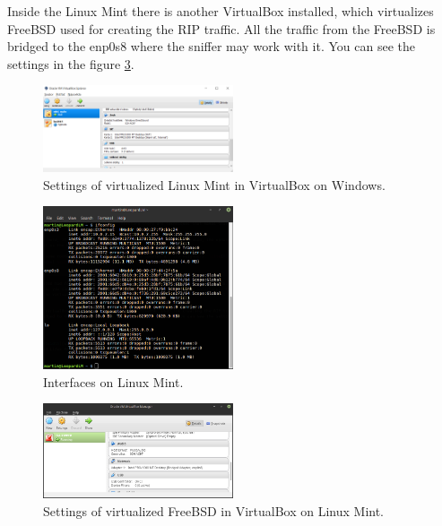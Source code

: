 \documentclass[10pt,a4paper,titlepage]{article}
\begin{document}
            Inside the Linux Mint there is another VirtualBox installed, which virtualizes FreeBSD used for creating the RIP traffic.
            All the traffic from the FreeBSD is bridged to the enp0s8 where the sniffer may work with it. You can see the settings
            in the figure \ref{fig:VBMintBSD}.

            \begin{figure}[h!]
                \begin{center}
                    \includegraphics[width=0.50\textwidth]{winmint.png}
                    \caption{Settings of virtualized Linux Mint in VirtualBox on Windows. \label{fig:VBWinMint}}
                \end{center}
            \end{figure}

            \begin{figure}[h!]
                \begin{center}
                    \includegraphics[width=0.50\textwidth]{mintifconfig.png}
                    \caption{Interfaces on Linux Mint. \label{fig:MintIfconfig}}
                \end{center}
            \end{figure}

            \begin{figure}[h!]
                \begin{center}
                    \includegraphics[width=0.50\textwidth]{mintbsd.png}
                    \caption{Settings of virtualized FreeBSD in VirtualBox on Linux Mint. \label{fig:VBMintBSD}}
                \end{center}
            \end{figure}
\end{document}
